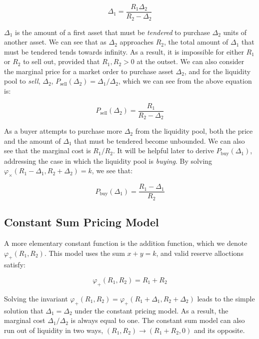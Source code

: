 \documentclass{article}
\begin{document}
\begin{equation}
\Delta_1 = \frac{R_1 \Delta_2}{R_2 - \Delta_2}
\end{equation}

$\Delta_1$ is the amount of a first asset that must be \emph{tendered} to purchase $\Delta_2$ units of another asset. We can see that as $\Delta_2$ approaches $R_2$, the total amount of $\Delta_1$ that must be tendered tends towards infinity. As a result, it is impossible for either $R_1$ or $R_2$ to sell out, provided that $R_1, R_2 > 0$ at the outset. We can also consider the marginal price for a market order to purchase asset $\Delta_2$, and for the liquidity pool to \emph{sell}, $\Delta_2$, $P_{\mathrm{sell}}(\Delta_2) = \Delta_1 / \Delta_2$, which we can see from the above equation is:

\begin{equation}
P_{\mathrm{sell}}(\Delta_2) = \frac{R_1}{R_2 - \Delta_2}
\end{equation}

As a buyer attempts to purchase more $\Delta_2$ from the liquidity pool, both the price and the amount of $\Delta_1$ that must be tendered become unbounded. We can also see that the marginal cost is $R_1 / R_2$. It will be helpful later to derive $P_{\mathrm{buy}}(\Delta_1)$, addressing the case in which the liquidity pool is \emph{buying}. By solving $\varphi_{\times}(R_1 - \Delta_1, R_2 + \Delta_2) = k$, we see that:

\begin{equation}
P_{\mathrm{buy}}(\Delta_1) = \frac{R_1 - \Delta_1}{R_2}
\end{equation}

\subsection{Constant Sum Pricing Model}
A more elementary constant function is the addition function, which we denote $\varphi_{+}(R_1, R_2)$. This model uses the sum $x + y = k$, and valid reserve alloctions satisfy:

\begin{equation}
\varphi_{+}(R_1, R_2) = R_1 + R_2
\end{equation}

Solving the invariant $\varphi_{+}(R_1, R_2) = \varphi_{+}(R_1 + \Delta_1, R_2 + \Delta_2)$ leads to the simple solution that $\Delta_1 = \Delta_2$ under the constant pricing model. As a result, the marginal cost $\Delta_1 / \Delta_2$ is always equal to one. The constant sum model can also run out of liquidity in two ways, $(R_1, R_2) \rightarrow (R_1 + R_2, 0)$ and its opposite.
\end{document}
